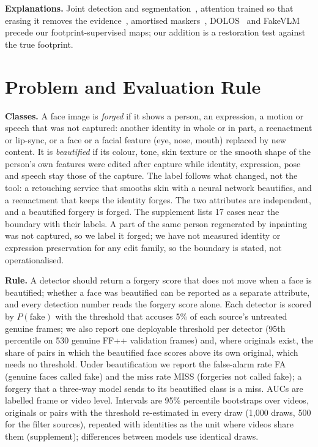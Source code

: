 \documentclass[conference]{IEEEtran}
\begin{document}
\textbf{Explanations.} Joint detection and segmentation~\cite{nguyen2019multitask,hifinet2023}, attention trained so that
erasing it removes the evidence~\cite{gain}, amortised maskers~\cite{dabkowski2017,phang2020}, DOLOS~\cite{dolos} and
FakeVLM~\cite{fakevlm2025} precede our footprint-supervised maps; our addition is a restoration test against the true footprint.

\section{Problem and Evaluation Rule}
\label{sec:protocol}
\textbf{Classes.} A face image is \emph{forged} if it shows a person, an expression, a motion or speech that was not captured:
another identity in whole or in part, a reenactment or lip-sync, or a face or a facial feature (eye, nose, mouth) replaced by
new content. It
is \emph{beautified} if its colour, tone, skin texture or the smooth shape of the person's own features were edited after
capture while identity, expression, pose and speech stay those of the capture. The label follows what changed, not the tool: a
retouching service that smooths skin with a neural network beautifies, and a reenactment that keeps the identity forges. The
two attributes are independent, and a beautified forgery is forged. The supplement lists 17 cases near the boundary with their labels. A part of the same person regenerated by inpainting was not captured, so we label it
forged; we have not measured identity or expression preservation for any edit family, so the boundary is stated, not
operationalised.


\textbf{Rule.} A detector should return a forgery score that does not move when a face is beautified; whether a face was
beautified can be reported as a separate attribute, and every detection number reads the forgery score alone. Each detector is
scored by $P(\text{fake})$ with the threshold that accuses 5\% of each source's untreated genuine frames; we also report one
deployable threshold per detector (95th percentile on 530 genuine FF++ validation frames) and, where originals exist, the
share of pairs in which the beautified face scores above its own original, which needs no threshold. Under beautification we
report the false-alarm rate FA (genuine faces called fake) and the miss rate MISS (forgeries not called fake); a forgery that
a three-way model sends to its beautified class is a miss. AUCs are labelled frame or video level. Intervals are 95\%
percentile bootstraps over videos, originals or pairs with the threshold re-estimated in every draw (1,000 draws, 500 for the
filter sources), repeated with identities as the unit where videos share them (supplement); differences between models use
identical draws.
\end{document}
